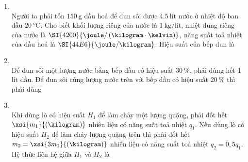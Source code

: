 \begin{enumerate}[label=\bfseries Câu \arabic*:, leftmargin=1.7cm]
	
	\item {}\\
Người ta phải tốn $\SI{150}{\gram}$ dầu hoả để đun sôi được $\SI{4.5}{\text{lít}}$ nước ở nhiệt độ ban đầu $\SI{20}{\celsius}$. Cho biết khối lượng riêng của nước là $\SI{1}{\kilogram/\text{lít}}$, nhiệt dung riêng của nước là $\SI{4200}{\joule/\left(\kilogram\cdot\kelvin\right)}$, năng suất toả nhiệt của dầu hoả là $\SI{44E6}{\joule/\kilogram}$. Hiệu suất của bếp đun là

\item {}\\
Để đun sôi một lượng nước bằng bếp dầu có hiệu suất $\SI{30}{\percent}$, phải dùng hết 1 lít dầu. Để đun sôi cũng lượng nước trên với bếp dầu có hiệu suất $\SI{20}{\percent}$ thì phải dùng

\item {}\\
Khi dùng lò có hiệu suất $H_1$ để làm chảy một lượng quặng, phải đốt hết $\xsi{m_1}{\left(\kilogram\right)}$ nhiên liệu có năng suất toả nhiệt $q_1$. Nếu dùng lò có hiệu suất $H_2$ để làm chảy lượng quặng trên thì phải đốt hết $m_2=\xsi{3m_1}{\left(\kilogram\right)}$ nhiên liệu có năng suất toả nhiệt $q_2=0,5q_1$. Hệ thức liên hệ giữa $H_1$ và $H_2$ là


\end{enumerate}
